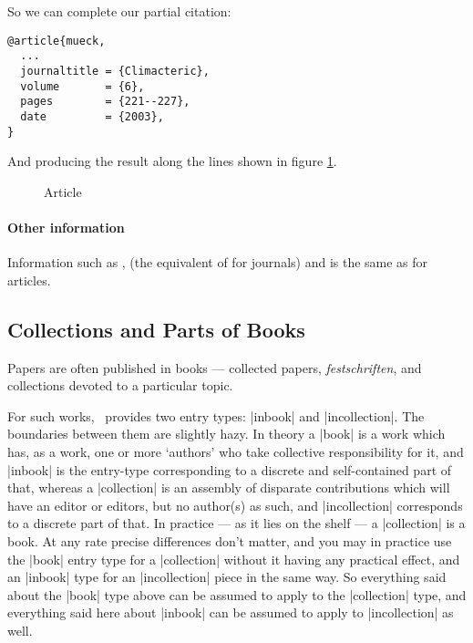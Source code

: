 {So we can complete our partial citation:
\begin{verbatim}
@article{mueck,
  ...
  journaltitle = {Climacteric},
  volume       = {6},
  pages        = {221--227},
  date         = {2003},
}
\end{verbatim}

And producing the result along the lines shown in figure \ref{mueck2}.

 \begin{figure}
\caption{Article\label{mueck2}}
\end{figure} 

\paragraph{Other information} Information such as ,  (the equivalent of  for journals) and  is the same as for articles.

\subsection{Collections and Parts of Books}

Papers are often published in books --- collected papers, \emph{festschriften}, and collections devoted to a particular topic.

For such works, \biblatex\ provides two entry types: |inbook| and |incollection|. The boundaries between them are slightly hazy. In theory a |book| is a work which has, as a work, one or more `authors' who take collective responsibility for it, and |inbook| is the entry-type corresponding to a discrete and self-contained part of that, whereas a |collection| is an assembly of disparate contributions which will have an editor or editors, but no author(s) as such, and |incollection| corresponds to a discrete part of that. In practice --- as it lies on the shelf --- a |collection| is a book. At any rate precise differences don't matter, and you may in practice use the |book| entry type for a |collection| without it having any practical effect, and an |inbook| type for an |incollection| piece in the same way. So everything said about the |book| type above can be assumed to apply to the |collection| type, and everything said here about |inbook| can be assumed to apply to |incollection| as well.

}
